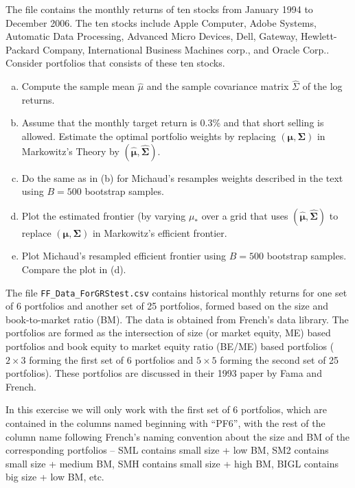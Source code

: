 \prob The file  contains the monthly returns of ten stocks from January 1994 to December 2006. The ten stocks include Apple Computer, Adobe Systems, Automatic Data Processing, Advanced Micro Devices, Dell, Gateway, Hewlett-Packard Company, International Business Machines corp., and Oracle Corp.. Consider portfolios that consists of these ten stocks.
	\begin{enumerate}[(a)]
	\item Compute the sample mean $\hat{\mu}$ and the sample covariance matrix $\hat{\Sigma}$ of the log returns. 
	\item Assume that the monthly target return is 0.3\% and that short selling is allowed. Estimate the optimal portfolio weights by replacing $(\mathbf{\mu},\mathbf{\Sigma})$ in Markowitz's Theory by $(\hat{\mathbf{\mu}}, \hat{\mathbf{\Sigma}})$. 
	\item Do the same as in (b) for Michaud's resamples weights described in the text using $B=500$ bootstrap samples.
	\item Plot the estimated frontier (by varying $\mu_*$ over a grid that uses $(\hat{\mathbf{\mu}},\hat{\mathbf{\Sigma}})$ to replace $(\mathbf{\mu},\mathbf{\Sigma})$ in Markowitz's efficient frontier.
	\item Plot Michaud's resampled efficient frontier using $B=500$ bootstrap samples. Compare the plot in (d). \twomedskip
	\end{enumerate}


\prob The file {\tt FF\_Data\_ForGRStest.csv} contains historical monthly returns for one set of 6 portfolios and another set of 25 portfolios, formed based on the size and book-to-market ratio (BM). The data is obtained from French's data library. The portfolios are formed as the intersection of size (or market equity, ME) based portfolios and book equity to market equity ratio (BE/ME) based portfolios ($2 \times 3$ forming the first set of 6 portfolios and $5 \times 5$ forming the second set of 25 portfolios). These portfolios are discussed in their 1993 paper by Fama and French.

In this exercise we will only work with the first set of 6 portfolios, which are contained in the columns named beginning with ``PF6'', with the rest of the column name following French's naming convention about the size and BM of the corresponding portfolios -- SML contains small size + low BM, SM2 contains small size + medium BM, SMH contains small size + high BM, BIGL contains big size + low BM, etc.

